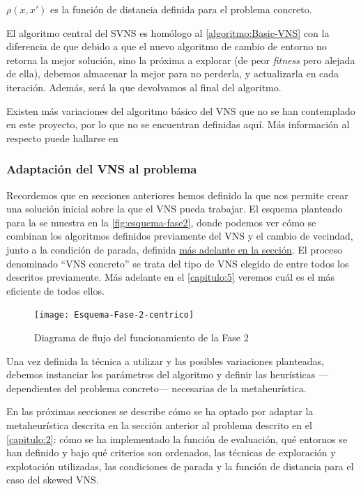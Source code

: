 $\rho(x,x')$ es la función de distancia definida para el problema concreto.

El algoritmo central del SVNS es homólogo al \autoref{algoritmo:Basic-VNS} con la diferencia de que debido a que el nuevo algoritmo de cambio de entorno no retorna la mejor solución, sino la próxima a explorar (de peor \textit{fitness} pero alejada de ella), debemos almacenar la mejor para no perderla, y actualizarla en cada iteración. Además, será la que devolvamos al final del algoritmo.

Existen más variaciones del algoritmo básico del VNS que no se han contemplado en este proyecto, por lo que no se encuentran definidas aquí. Más información al respecto puede hallarse en~\cite{vns}

\subsubsection{Adaptación del VNS al problema}
\label{apartado:adaptacion-VNS}

Recordemos que en secciones anteriores hemos definido la \faseuno{} que nos permite crear una solución inicial sobre la que el VNS pueda trabajar. El esquema planteado para la \fasedos{} se muestra en la \autoref{fig:esquema-fase2}, donde podemos ver cómo se combinan los algoritmos definidos previamente del VNS y el cambio de vecindad, junto a la condición de parada, definida \hyperref[apartado:condiciones-parada]{más adelante en la sección}. El proceso denominado ``VNS concreto'' se trata del tipo de VNS elegido de entre todos los descritos previamente. Más adelante en el \autoref{capitulo:5} veremos cuál es el más eficiente de todos ellos.

\begin{figure}[htbp]
    \centering
    \texttt{[image: Esquema-Fase-2-centrico]}
    \caption{Diagrama de flujo del funcionamiento de la Fase 2}
    \label{fig:esquema-fase2}
\end{figure}

\vspace*{\fill}

Una vez definida la técnica a utilizar y las posibles variaciones planteadas, debemos instanciar los parámetros del algoritmo y definir las heurísticas ---dependientes del problema concreto--- necesarias de la metaheurística.

En las próximas secciones se describe cómo se ha optado por adaptar la metaheurística descrita en la sección anterior al problema descrito en el \autoref{capitulo:2}: cómo se ha implementado la función de evaluación, qué entornos se han definido y bajo qué criterios son ordenados, las técnicas de exploración y explotación utilizadas, las condiciones de parada y la función de distancia para el caso del skewed VNS.

